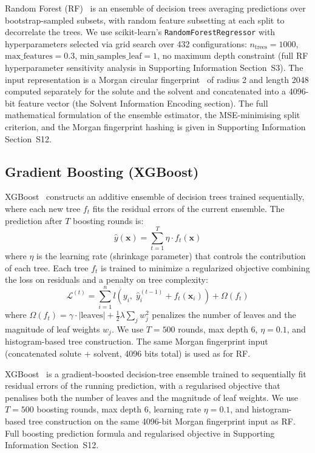 \documentclass[journal=jcisd8,manuscript=article]{achemso}
\newcommand{\vect}[1]{\mathbf{#1}}
\newcommand{\added}[1]{{\color{addedblue}#1}}
\newcommand{\removed}[1]{{\color{removedred}#1}}
\begin{document}
\added{Random Forest (RF)~\cite{breiman2001random} is an ensemble of decision trees averaging predictions over bootstrap-sampled subsets, with random feature subsetting at each split to decorrelate the trees. We use scikit-learn's \texttt{RandomForestRegressor} with hyperparameters selected via grid search over 432 configurations: $n_\text{trees} = 1000$, $\text{max\_features} = 0.3$, $\text{min\_samples\_leaf} = 1$, no maximum depth constraint (full RF hyperparameter sensitivity analysis in Supporting Information Section~S3). The input representation is a Morgan circular fingerprint~\cite{rogers2010extended} of radius 2 and length 2048 computed separately for the solute and the solvent and concatenated into a 4096-bit feature vector (the Solvent Information Encoding section). The full mathematical formulation of the ensemble estimator, the MSE-minimising split criterion, and the Morgan fingerprint hashing is given in Supporting Information Section~S12.}


\subsection{Gradient Boosting (XGBoost)}
\label{sec:xgboost}

\removed{XGBoost~\cite{chen2016xgboost} constructs an additive ensemble of decision trees trained sequentially, where each new tree $f_t$ fits the residual errors of the current ensemble.
The prediction after $T$ boosting rounds is:
\begin{equation}
 \hat{y}(\vect{x}) = \sum_{t=1}^{T} \eta \cdot f_t(\vect{x})
\end{equation}
where $\eta$ is the learning rate (shrinkage parameter) that controls the contribution of each tree.
Each tree $f_t$ is trained to minimize a regularized objective combining the loss on residuals and a penalty on tree complexity:
\begin{equation}
 \mathcal{L}^{(t)} = \sum_{i=1}^{n} l\!\left(y_i,\; \hat{y}_i^{(t-1)} + f_t(\vect{x}_i)\right) + \Omega(f_t)
\end{equation}
where $\Omega(f_t) = \gamma \cdot |\text{leaves}| + \tfrac{1}{2}\lambda \sum_j w_j^2$ penalizes the number of leaves and the magnitude of leaf weights $w_j$.
We use $T = 500$ rounds, max depth 6, $\eta = 0.1$, and histogram-based tree construction.
The same Morgan fingerprint input (concatenated solute + solvent, 4096 bits total) is used as for RF.}

\added{XGBoost~\cite{chen2016xgboost} is a gradient-boosted decision-tree ensemble trained to sequentially fit residual errors of the running prediction, with a regularised objective that penalises both the number of leaves and the magnitude of leaf weights. We use $T = 500$ boosting rounds, max depth 6, learning rate $\eta = 0.1$, and histogram-based tree construction on the same 4096-bit Morgan fingerprint input as RF. Full boosting prediction formula and regularised objective in Supporting Information Section~S12.}
\end{document}
